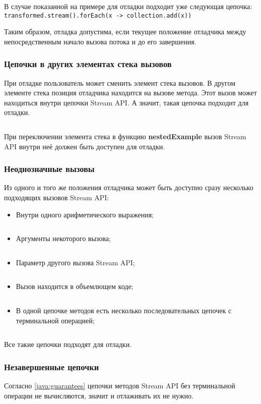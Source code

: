В случае показанной на примере для отладки подходит уже следующая цепочка: \texttt{transformed.stream().forEach(x -> collection.add(x))}

Таким образом, отладка допустима, если текущее положение отладчика между непосредственным начало вызова потока и до его завершения.

\subsubsection{Цепочки в других элементах стека вызовов}
При отладке пользователь может сменить элемент стека вызовов. В другом элементе стека позиция отладчика находится на вызове метода. Этот вызов может находиться внутри цепочки Stream API. А значит, такая цепочка подходит для отладки.
\inputminted{java}{chapter2/code/NestedMethod.java}

При переключении элемента стека в функцию \textbf{nestedExample} вызов Stream API внутри неё должен быть доступен для отладки.

\subsubsection{Неоднозначные вызовы}
Из одного и того же положения отладчика может быть доступно сразу несколько подходящих вызовов Stream API:
\begin{itemize}
	\item Внутри одного арифметического выражения;
	\inputminted{java}{chapter2/code/AmbiguousPlus.java}
	\item Аргументы некоторого вызова;
	\inputminted{java}{chapter2/code/AmbiguousArgs.java}
	\item Параметр другого вызова Stream API;
	\inputminted{java}{chapter2/code/AmbiguousNested.java}
	\item Вызов находится в объемлющем коде;
	\inputminted{java}{chapter2/code/AmbiguousLambda.java}
	\item В одной цепочке методов есть несколько последовательных цепочек с терминальной операцией;
	\inputminted{java}{chapter2/code/AmbiguousLinkedChains.java}
\end{itemize}
Все такие цепочки подходят для отладки.

\subsubsection{Незавершенные цепочки}\label{java:incomplete}
Согласно \ref{java:guarantees} цепочки методов Stream API без терминальной операции не вычисляются, значит и отлаживать их не нужно.

